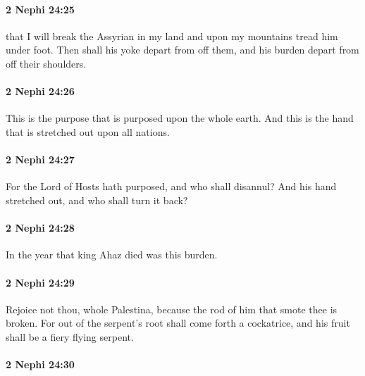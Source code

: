 		\paragraph{2 Nephi 24:25} %
			\label{2NEPHI-24-25}

			that I will break the Assyrian in my land
			and upon my mountains tread him under foot.
			Then shall his yoke depart from off them,
			and his burden depart from off their shoulders.

		\paragraph{2 Nephi 24:26} %
			\label{2NEPHI-24-26}

			This is the purpose that is purposed upon the whole earth.
			And this is the hand that is stretched out upon all nations.

		\paragraph{2 Nephi 24:27} %
			\label{2NEPHI-24-27}

			For the Lord of Hosts hath purposed,
			and who shall disannul?
			And his hand stretched out,
			and who shall turn it back?

		\paragraph{2 Nephi 24:28} %
			\label{2NEPHI-24-28}

			In the year that king Ahaz died was this burden.

		\paragraph{2 Nephi 24:29} %
			\label{2NEPHI-24-29}

			Rejoice not thou, whole Palestina,
			because the rod of him that smote thee is broken.
			For out of the serpent's root shall come forth a cockatrice,
			and his fruit shall be a fiery flying serpent.

		\paragraph{2 Nephi 24:30} %
			\label{2NEPHI-24-30}

